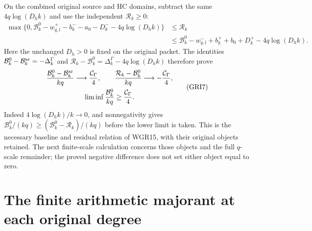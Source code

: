 \documentclass[11pt,a4paper]{article}
\begin{document}
On the combined original source and HC domains, subtract the
same $4q\log(D_hk)$ and use the independent $\mathcal R_k\geq0$:
\[
\begin{aligned}
 \max\{0,\mathcal B_k^0-w^+_{q,l}-b_k^--a_0-D_k^-
                                      -4q\log(D_hk)\}
 &\leq\mathcal R_k\\
 &\leq\mathcal B_k^0-w^-_{q,l}+b_k^++b_0+D_k^+
                                      -4q\log(D_hk).
\end{aligned}\tag{GRI6}
\]
Here the unchanged $D_h>0$ is fixed on the original packet.
The identities $\mathcal B_k^0-\mathcal B_k^{\rm ar}=-\Delta_k^\Gamma$
and $\mathcal R_k-\mathcal B_k^0=\Delta_k^\Gamma-4q\log(D_hk)$
therefore prove
\[
\begin{gathered}
 \frac{\mathcal B_k^0-\mathcal B_k^{\rm ar}}{kq}
                  \longrightarrow\frac{\mathcal C_\Gamma}{4},\qquad
 \frac{\mathcal R_k-\mathcal B_k^0}{kq}
                  \longrightarrow-\frac{\mathcal C_\Gamma}{4},\\
 \liminf\frac{\mathcal B_k^0}{kq}\geq\frac{\mathcal C_\Gamma}{4}.
\end{gathered}\tag{GRI7}
\]
Indeed $4\log(D_hk)/k\to0$, and nonnegativity gives
$\mathcal B_k^0/(kq)\geq(\mathcal B_k^0-\mathcal R_k)/(kq)$
before the lower limit is taken. This is the necessary
baseline and residual relation of WGR15, with their original
objects retained. The next finite-scale calculation concerns
those objects and the full $q$-scale remainder; the proved
negative difference does not set either object equal to zero.


\section{The finite arithmetic majorant at each original degree}
\end{document}
